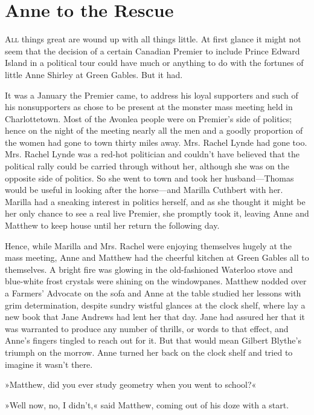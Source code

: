 \chapter{Anne to the Rescue}
	
\lettrine[lines=4]{A}{ll} things great are wound up with all things little. At first glance it might not seem that the decision of a certain Canadian Premier to include Prince Edward Island in a political tour could have much or anything to do with the fortunes of little Anne Shirley at Green Gables. But it had.

It was a January the Premier came, to address his loyal supporters and such of his nonsupporters as chose to be present at the monster mass meeting held in Charlottetown. Most of the Avonlea people were on Premier's side of politics; hence on the night of the meeting nearly all the men and a goodly proportion of the women had gone to town thirty miles away. Mrs. Rachel Lynde had gone too. Mrs. Rachel Lynde was a red-hot politician and couldn't have believed that the political rally could be carried through without her, although she was on the opposite side of politics. So she went to town and took her husband—Thomas would be useful in looking after the horse—and Marilla Cuthbert with her. Marilla had a sneaking interest in politics herself, and as she thought it might be her only chance to see a real live Premier, she promptly took it, leaving Anne and Matthew to keep house until her return the following day.

Hence, while Marilla and Mrs. Rachel were enjoying themselves hugely at the mass meeting, Anne and Matthew had the cheerful kitchen at Green Gables all to themselves. A bright fire was glowing in the old-fashioned Waterloo stove and blue-white frost crystals were shining on the windowpanes. Matthew nodded over a Farmers' Advocate on the sofa and Anne at the table studied her lessons with grim determination, despite sundry wistful glances at the clock shelf, where lay a new book that Jane Andrews had lent her that day. Jane had assured her that it was warranted to produce any number of thrills, or words to that effect, and Anne's fingers tingled to reach out for it. But that would mean Gilbert Blythe's triumph on the morrow. Anne turned her back on the clock shelf and tried to imagine it wasn't there.

»Matthew, did you ever study geometry when you went to school?«

»Well now, no, I didn't,« said Matthew, coming out of his doze with a start.

